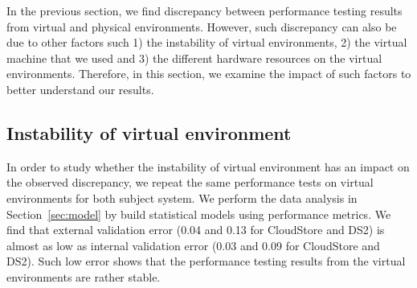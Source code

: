 In the previous section, we find discrepancy between performance testing results from virtual and physical environments. However, such discrepancy can also be due to other factors such 1) the instability of virtual environments, 2) the virtual machine that we used and 3) the different hardware resources on the virtual environments. Therefore, in this section, we examine the impact of such factors to better understand our results. 


\subsection{Instability of virtual environment}

In order to study whether the instability of virtual environment has an impact on the observed discrepancy, we repeat the same performance tests on virtual environments for both subject system. We perform the data analysis in Section~\ref{sec:model} by build statistical models using performance metrics. %
We find that external validation error (0.04 and 0.13 for CloudStore and DS2) is almost as low as internal validation error (0.03 and 0.09 for CloudStore and DS2). Such low error shows that the performance testing results from the virtual environments are rather stable. 


